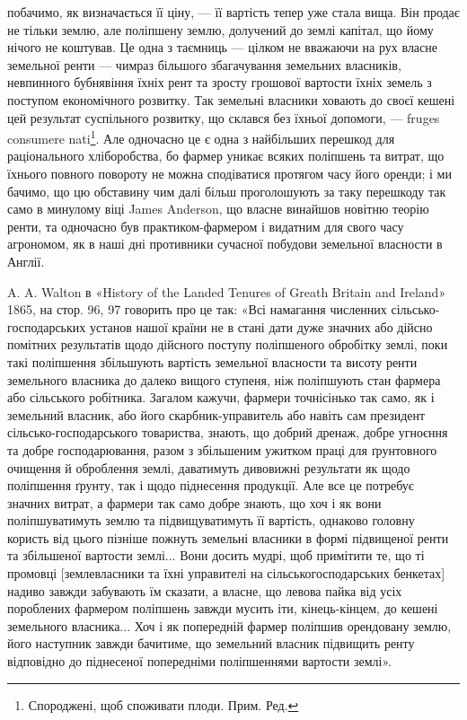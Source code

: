 \parcont{}  %
побачимо, як визначається її ціну, — її вартість тепер уже стала вища. Він продає
не тільки землю, але поліпшену землю, долучений до землі капітал, що йому
нічого не коштував. Це одна з таємниць — цілком не вважаючи на рух власне
земельної ренти — чимраз більшого збагачування земельних власників, невпинного бубнявіння їхніх рент
та зросту грошової вартости їхніх земель з поступом
економічного розвитку. Так земельні власники ховають до своєї кешені цей
результат суспільного розвитку, що склався без їхньої допомоги, — fruges consumere nati\footnote*{
Спороджені, щоб споживати плоди. Прим. Ред.
}. Але
одночасно це є одна з найбільших перешкод для раціонального хліборобства, бо фармер уникає всяких
поліпшень та витрат, що їхнього
повного повороту не можна сподіватися протягом часу його оренди; і ми
бачимо, що цю обставину чим далі більш проголошують за таку перешкоду
так само в минулому віці James Anderson, що власне винайшов новітню теорію
ренти, та одночасно був практиком-фармером і видатним для свого часу агрономом, як в наші дні
противники сучасної побудови земельної власности в Англії.

A. A. Walton в «History of the Landed Tenures of Greath Britain and
Ireland» 1865, на стор. 96, 97 говорить про це так: «Всі намагання численних
сільсько-господарських установ нашої країни не в стані дати дуже значних або
дійсно помітних результатів щодо дійсного поступу поліпшеного обробітку землі,
поки такі поліпшення збільшують вартість земельної власности та висоту ренти
земельного власника до далеко вищого ступеня, ніж поліпшують стан фармера
або сільського робітника. Загалом кажучи, фармери точнісінько так само, як
і земельний власник, або його скарбник-управитель або навіть сам президент
сільсько-господарського товариства, знають, що добрий дренаж, добре угноєння та добре
господарювання, разом з збільшеним ужитком праці для
ґрунтовного очищення й оброблення землі, даватимуть дивовижні результати
як щодо поліпшення ґрунту, так і щодо піднесення продукції. Але все це
потребує значних витрат, а фармери так само добре знають, що хоч і як
вони поліпшуватимуть землю та підвищуватимуть її вартість, однаково головну користь від цього
пізніше пожнуть земельні власники в формі підвищеної ренти та збільшеної вартости землі... Вони
досить мудрі, щоб
примітити те, що ті промовці [землевласники та їхні управителі на сільськогосподарських
бенкетах] надиво завжди забувають їм сказати, а власне, що
левова пайка від усіх пороблених фармером поліпшень завжди мусить іти,
кінець-кінцем, до кешені земельного власника... Хоч і як попередній фармер
поліпшив орендовану землю, його наступник завжди бачитиме, що земельний
власник підвищить ренту відповідно до піднесеної попередніми поліпшеннями
вартости землі».

